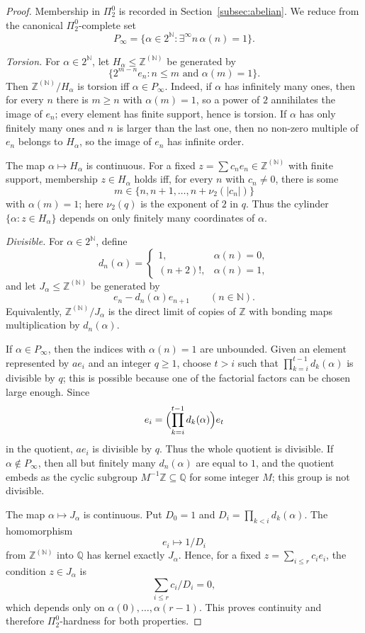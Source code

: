 \documentclass[12pt,fleqn,a4paper]{amsart}
\renewcommand{\le}{\leqslant}
\renewcommand{\ge}{\geqslant}
\numberwithin{equation}{section}
\theoremstyle{definition}
\newcommand{\N}{\mathbb{N}}
\newcommand{\Q}{\mathbb{Q}}
\newcommand{\Z}{\mathbb{Z}}
\begin{document}
\begin{proof}
Membership in $\Pi^0_2$ is recorded in Section~\ref{subsec:abelian}.  We reduce from
the canonical $\Pi^0_2$-complete set
\[
        P_\infty=\{\alpha\in2^\N: \exists^\infty n\, \alpha(n)=1\}.
\]

\emph{Torsion.}
For $\alpha\in2^\N$, let $H_\alpha\le\Z^{(\N)}$ be generated by
\[
        \{2^{m-n}e_n:n\le m\text{ and }\alpha(m)=1\}.
\]
Then $\Z^{(\N)}/H_\alpha$ is torsion iff $\alpha\in P_\infty$.  Indeed, if
$\alpha$ has infinitely many ones, then for every $n$ there is $m\ge n$ with
$\alpha(m)=1$, so a power of $2$ annihilates the image of $e_n$; every element has
finite support, hence is torsion.  If $\alpha$ has only finitely many ones and $n$ is
larger than the last one, then no non-zero multiple of $e_n$ belongs to $H_\alpha$, so
the image of $e_n$ has infinite order.

The map $\alpha\mapsto H_\alpha$ is continuous.  For a fixed
$z=\sum c_ne_n\in\Z^{(\N)}$ with finite support, membership $z\in H_\alpha$ holds
iff, for every $n$ with $c_n\ne0$, there is some
\[
        m\in\{n,n+1,\dots,n+\nu_2(|c_n|)\}
\]
with $\alpha(m)=1$; here $\nu_2(q)$ is the exponent of $2$ in $q$.  Thus the cylinder
$\{\alpha:z\in H_\alpha\}$ depends on only finitely many coordinates of
$\alpha$.

\emph{Divisible.}
For $\alpha\in2^\N$, define
\[
        d_n(\alpha)=
        \begin{cases}
        1, & \alpha(n)=0,\\
        (n+2)!, & \alpha(n)=1,
        \end{cases}
\]
and let $J_\alpha\le\Z^{(\N)}$ be generated by
\[
        e_n-d_n(\alpha)e_{n+1}\qquad(n\in\N).
\]
Equivalently, $\Z^{(\N)}/J_\alpha$ is the direct limit of copies of $\Z$ with
bonding maps multiplication by $d_n(\alpha)$.

If $\alpha\in P_\infty$, then the indices with $\alpha(n)=1$ are unbounded.  Given
an element represented by $ae_i$ and an integer $q\ge1$, choose $t>i$ such that
$\prod_{k=i}^{t-1}d_k(\alpha)$ is divisible by $q$; this is possible because one of
the factorial factors can be chosen large enough.  Since
\[
        e_i=\Bigl(\prod_{k=i}^{t-1}d_k(\alpha)\Bigr)e_t
\]
in the quotient, $ae_i$ is divisible by $q$.  Thus the whole quotient is divisible.
If $\alpha\notin P_\infty$, then all but finitely many $d_n(\alpha)$ are equal to
$1$, and the quotient embeds as the cyclic subgroup $M^{-1}\Z\subseteq\Q$
for some integer $M$; this group is not divisible.

The map $\alpha\mapsto J_\alpha$ is continuous.  Put
$D_0=1$ and $D_i=\prod_{k<i}d_k(\alpha)$.  The homomorphism
\[
        e_i\longmapsto 1/D_i
\]
from $\Z^{(\N)}$ into $\Q$ has kernel exactly $J_\alpha$.  Hence, for a fixed
$z=\sum_{i\le r}c_ie_i$, the condition $z\in J_\alpha$ is
\[
        \sum_{i\le r} c_i/D_i=0,
\]
which depends only on $\alpha(0),\dots,\alpha(r-1)$.  This proves continuity and
therefore $\Pi^0_2$-hardness for both properties.
\end{proof}
\end{document}
